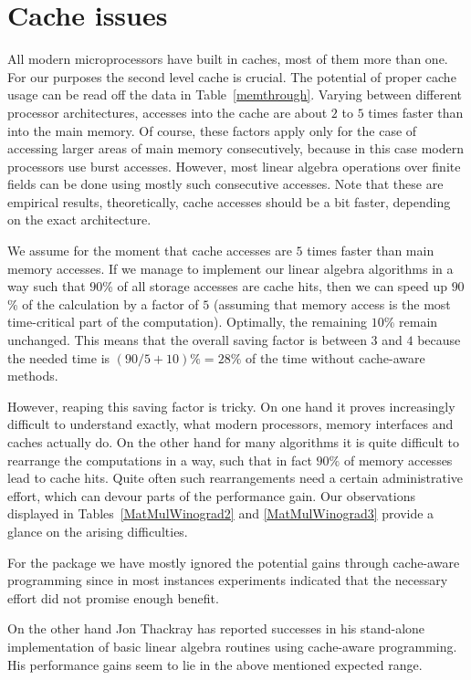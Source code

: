 \section{Cache issues}
\label{sec:cache}
 
All modern microprocessors have built in caches, most of them more than
one. For our purposes the second level cache is crucial. The potential
of proper cache usage can be read off the data in
Table~\ref{memthrough}. Varying between different processor
architectures, accesses into the cache are about $2$ to $5$ times faster
than into the main memory. Of course, these factors apply only for the
case of accessing larger areas of main memory consecutively, because
in this case modern processors use burst accesses. However, most
linear algebra operations over finite fields can be done using mostly 
such consecutive accesses. Note that these are empirical results,
theoretically, cache accesses should be a bit faster, depending on the
exact architecture.

We assume for the moment that cache accesses are $5$ times faster
than main memory accesses. If we manage to implement our linear
algebra algorithms in a way such that $90$\% of all storage accesses
are cache hits, then we can speed up $90$\% of the calculation by a
factor of $5$ (assuming that memory access is the most time-critical
part of the computation). Optimally, the remaining $10$\% remain unchanged.
This means that the overall saving factor is between $3$ and $4$ because the
needed time is $(90/5+10)\% = 28\%$ of the time without cache-aware
methods. 

However, reaping this saving factor is tricky. On one hand it proves
increasingly difficult to understand exactly, what modern processors,
memory interfaces and caches actually do. On the other hand for many
algorithms it is quite difficult to rearrange the computations in a
way, such that in fact $90\%$ of memory accesses lead to cache hits.
Quite often such rearrangements need a certain administrative effort,
which can devour parts of the performance gain.
Our observations displayed in Tables~\ref{MatMulWinograd2} and
\ref{MatMulWinograd3} provide a glance on the arising difficulties.

For the {\cvec} package we have mostly ignored the potential gains
through cache-aware programming since in most instances experiments
indicated that the necessary effort did not promise enough benefit.

On the other hand Jon Thackray has reported successes in his
stand-alone implementation of basic linear algebra routines using
cache-aware programming. His performance gains seem to lie in the
above mentioned expected range.
 
